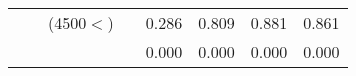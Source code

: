 \begin{table}[p]
\begin{tabular}{cclcllll}
                                                               &                                                                 & (4500$<$)                                                              &                                                                        &  0.286                                     & 0.809                                             & 0.881                                              & 0.861  \\ 
                                                               &                                                                 &                                                                                &                                                                        &  0.000                                      & 0.000                                            & 0.000                                              & 0.000  \\  
 \bottomrule
\end{tabular}
\label{tab:Step-wise julian date}
\end{table}